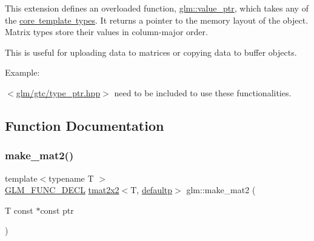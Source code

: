 This extension defines an overloaded function, \mbox{\hyperlink{group__gtc__type__ptr_gaf019636bb8bd7c9efb7c7ce3bb23bcfc}{glm\+::value\+\_\+ptr}}, which takes any of the \mbox{\hyperlink{group__core__template}{core template types}}. It returns a pointer to the memory layout of the object. Matrix types store their values in column-\/major order.

This is useful for uploading data to matrices or copying data to buffer objects.

Example\+: 
\begin{DoxyCode}{0}
\DoxyCodeLine{}
\DoxyCodeLine{}
\end{DoxyCode}


$<$\mbox{\hyperlink{type__ptr_8hpp}{glm/gtc/type\+\_\+ptr.\+hpp}}$>$ need to be included to use these functionalities. 

\subsection{Function Documentation}
\mbox{\label{group__gtc__type__ptr_ga52a16e333fef7e33ca740779482a8693}} 
\subsubsection{\texorpdfstring{make\_mat2()}{make\_mat2()}}
{\footnotesize\ttfamily template$<$typename T $>$ \\
\mbox{\hyperlink{setup_8hpp_ab2d052de21a70539923e9bcbf6e83a51}{G\+L\+M\+\_\+\+F\+U\+N\+C\+\_\+\+D\+E\+CL}} \mbox{\hyperlink{structglm_1_1tmat2x2}{tmat2x2}}$<$T, \mbox{\hyperlink{namespaceglm_a0f04f086094c747d227af4425893f545a9d21ccd8b5a009ec7eb7677befc3bf51}{defaultp}}$>$ glm\+::make\+\_\+mat2 (\begin{DoxyParamCaption}\item[{T const $\ast$const}]{ptr }\end{DoxyParamCaption})}


